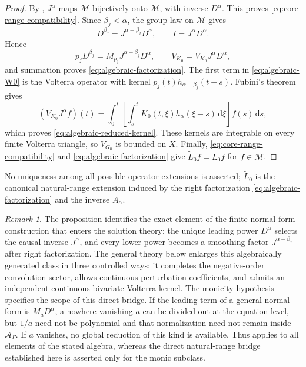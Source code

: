 \documentclass[11pt]{article}
\numberwithin{equation}{section}
\theoremstyle{definition}
\theoremstyle{remark}
\newtheorem{remark}{Remark}
\newcommand{\M}{\mathcal M}
\newcommand{\A}{\mathcal A}
\newcommand{\dd}{\,\mathrm d}
\begin{document}
\begin{proof}
By , $J^\alpha$ maps $\M$ bijectively onto
$\M$, with inverse $D^\alpha$.  This proves
\eqref{eq:core-range-compatibility}.  Since $\beta_j<\alpha$, the group law on
$\M$ gives
\begin{equation*}
D^{\beta_j}=J^{\alpha-\beta_j}D^\alpha,
\qquad
I=J^\alpha D^\alpha.
\end{equation*}
Hence
\begin{equation*}
p_jD^{\beta_j}=M_{p_j}J^{\alpha-\beta_j}D^\alpha,
\qquad
V_{K_0}=V_{K_0}J^\alpha D^\alpha,
\end{equation*}
and summation proves \eqref{eq:algebraic-factorization}.  The first term in
\eqref{eq:algebraic-W0} is the Volterra operator with kernel
$p_j(t)h_{\alpha-\beta_j}(t-s)$.  Fubini's theorem gives
\begin{equation*}
(V_{K_0}J^\alpha f)(t)
=\int_0^t\left[\int_s^tK_0(t,\xi)h_\alpha(\xi-s)\dd\xi\right]f(s)\dd s,
\end{equation*}
which proves \eqref{eq:algebraic-reduced-kernel}.  These kernels are
integrable on every finite Volterra triangle, so $V_{G_0}$ is bounded on
$X$.  Finally, \eqref{eq:core-range-compatibility} and
\eqref{eq:algebraic-factorization} give
$\widetilde L_0f=L_0f$ for $f\in\M$.
\end{proof}

No uniqueness among all possible operator extensions is asserted; $\widetilde L_0$ is the canonical natural-range extension induced by the right factorization \eqref{eq:algebraic-factorization} and the inverse $A_\alpha$.

\begin{remark}
The proposition identifies the exact element of the finite-normal-form
construction that enters the solution theory: the unique leading power
$D^\alpha$ selects the causal inverse $J^\alpha$, and every lower power becomes
a smoothing factor $J^{\alpha-\beta_j}$ after right factorization.  The general
theory below enlarges this algebraically generated class in three controlled
ways: it completes the negative-order convolution sector, allows continuous
perturbation coefficients, and admits an independent continuous bivariate
Volterra kernel. The monicity hypothesis specifies the scope of this direct
bridge. If the leading term of a general
normal form is $M_aD^\alpha$, a nowhere-vanishing $a$ can be divided out at the
equation level, but $1/a$ need not be polynomial and that normalization need
not remain inside $\A_\Gamma$.  If $a$ vanishes, no global reduction of this
kind is available.  Thus  applies to all elements of the
stated algebra, whereas the direct natural-range bridge established here is
asserted only for the monic subclass.
\end{remark}
\end{document}
